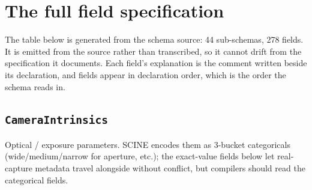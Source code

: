 \section{The full field specification}
\label{app:spec}

The table below is generated from the schema source: 44 sub-schemas, 278 fields. It is emitted from the source rather than transcribed, so it cannot drift from the specification it documents. Each field's explanation is the comment written beside its declaration, and fields appear in declaration order, which is the order the schema reads in.

\subsection*{\texttt{CameraIntrinsics}}
\noindent Optical /\allowbreak{} exposure parameters. SCINE encodes them as 3-bucket categoricals (wide/\allowbreak{}medium/\allowbreak{}narrow for aperture, etc.); the exact-value fields below let real-capture metadata travel alongside without conflict, but compilers should read the categorical fields.

